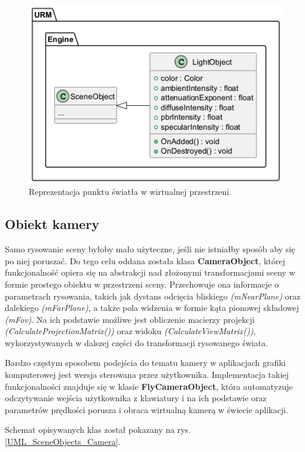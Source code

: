 	\begin{figure}[h!]
		\centering
		\includegraphics[width=\textwidth]{images/UML/sceneobjects_light.png}
		\caption{Reprezentacja punktu światła w wirtualnej przestrzeni.}
		\label{UML_SceneObjects_Light}
	\end{figure}
	
\subsection{Obiekt kamery}
	Samo rysowanie sceny byłoby mało użyteczne, jeśli nie istniałby sposób aby się po niej poruszać. Do tego celu oddana została klasa \textbf{CameraObject}, której funkcjonalność opiera się na abstrakcji nad złożonymi transformacjami sceny w formie prostego obiektu w przestrzeni sceny. Przechowuje ona informacje o parametrach rysowania, takich jak dystans odcięcia bliskiego \textit{(mNearPlane)} oraz dalekiego \textit{(mFarPlane)}, a także pola widzenia w formie kąta pionowej składowej \textit{(mFov)}. Na ich podstawie możliwe jest obliczenie macierzy projekcji \textit{(CalculateProjectionMatrix())} oraz widoku \textit{(CalculateViewMatrix())}, wykorzystywanych w dalszej części do transformacji rysowanego świata.
	
	Bardzo częstym sposobem podejścia do tematu kamery w aplikacjach grafiki komputerowej jest wersja sterowana przez użytkownika. Implementacja takiej funkcjonalności znajduje się w klasie \textbf{FlyCameraObject}, która automatyzuje odczytywanie wejścia użytkownika z klawiatury i na ich podstawie oraz parametrów prędkości porusza i obraca wirtualną kamerą w świecie aplikacji.
	
	Schemat opisywanych klas został pokazany na rys. \ref{UML_SceneObjects_Camera}.
	
